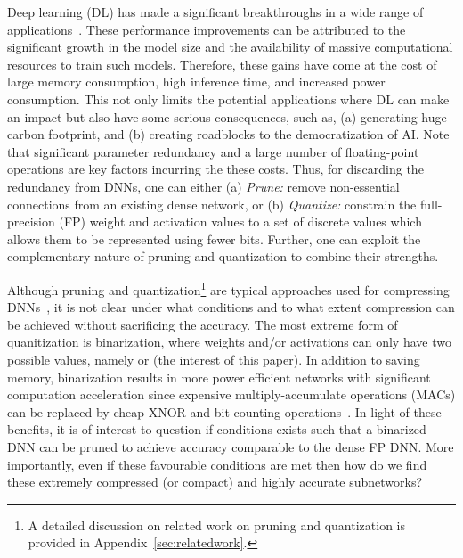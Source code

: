 \documentclass{article} \usepackage{iclr2021_conference,times}
\begin{document}
Deep learning (DL) has made a significant breakthroughs in a wide range of applications~\citep{goodfellow2016deep}.
These performance improvements can be attributed to the significant growth in the model size and the availability of massive computational resources to train such models. 
Therefore, these gains have come at the cost of large memory consumption, high inference time, and increased power consumption. 
This not only limits the potential applications where DL can make an impact but also have some serious consequences, such as, (a) generating huge carbon footprint, and (b) creating roadblocks to the democratization of AI. 
Note that significant parameter redundancy and a large number of floating-point operations are key factors incurring the these costs. Thus, for discarding the redundancy from DNNs, one can either (a) \emph{Prune:} remove non-essential connections from an existing dense network, or (b) \emph{Quantize:} constrain the full-precision (FP) weight and activation values to a set of discrete values which allows them to be represented using fewer bits. Further, one can exploit the complementary nature of pruning and quantization to combine their strengths.


Although pruning and quantization\footnote{A detailed discussion on related work on pruning and quantization is provided in Appendix~\ref{sec:relatedwork}.
} are typical approaches used for compressing DNNs~\citep{cheng2017survey}, it is not clear under what conditions and to what extent compression can be achieved without sacrificing the accuracy. The most extreme form of quanitization is binarization, where weights and/or activations can only have two possible values, namely  or  (the interest of this paper). In addition to saving memory, binarization results in more power efficient networks with significant computation acceleration since expensive multiply-accumulate operations (MACs) can be replaced by cheap XNOR and bit-counting operations~\citep{qin2020binary}. In light of these benefits, it is of interest to question if conditions exists such that a binarized DNN can be pruned to achieve accuracy comparable to the dense FP DNN.
More importantly, even if these favourable conditions are met then how do we find these extremely compressed (or compact) and highly accurate subnetworks?
\end{document}
